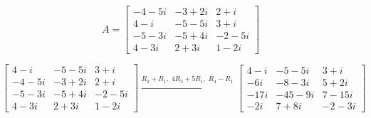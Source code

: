 \documentclass{article}
\begin{document}







\[
A =
\begin{bmatrix}
-4-5i & -3+2i & 2+i\\
4-i & -5-5i & 3+i\\
-5-3i & -5+4i & -2-5i\\
4-3i & 2+3i & 1-2i
\end{bmatrix}
\]

\[
\begin{bmatrix}
4-i & -5-5i & 3+i\\
-4-5i & -3+2i & 2+i\\
-5-3i & -5+4i & -2-5i\\
4-3i & 2+3i & 1-2i
\end{bmatrix}
\xrightarrow{R_2+R_1,\; 4R_3+5R_1,\; R_4-R_1}
\begin{bmatrix}
4-i & -5-5i & 3+i\\
-6i & -8-3i & 5+2i\\
-17i & -45-9i & 7-15i\\
-2i & 7+8i & -2-3i
\end{bmatrix}
\]
\end{document}
